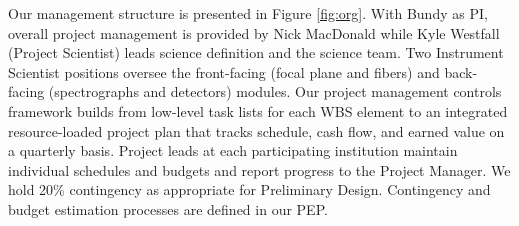 \documentclass[oneside,11pt]{amsart}
\begin{document}
Our management structure is presented in Figure \ref{fig:org}.  With Bundy as PI, overall project management is
provided by Nick MacDonald while Kyle Westfall (Project Scientist) leads science definition and the science team.  Two
Instrument Scientist positions oversee the front-facing (focal plane and fibers) and back-facing (spectrographs and
detectors) modules.  Our project management controls framework builds from low-level task lists for each WBS element to
an integrated resource-loaded project plan that tracks schedule, cash flow, and earned value on a quarterly basis.
Project leads at each participating institution maintain individual schedules and budgets and report progress to the
Project Manager.  We hold 20\% contingency as appropriate for Preliminary Design. Contingency and budget estimation
processes are defined in our PEP.





\newpage

\setcounter{page}{1}


\end{document}
